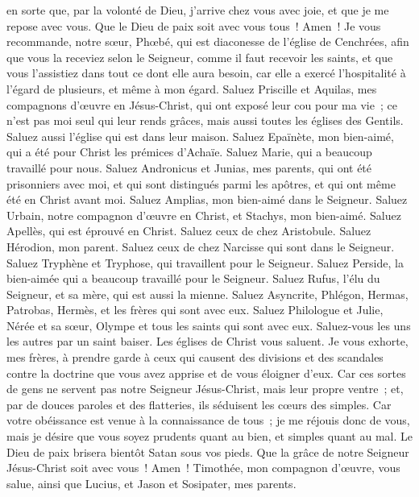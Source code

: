 \begin{multicols}{2}
en sorte que, par la volonté de Dieu, j'arrive chez vous avec joie, et que je me repose avec vous.
Que le Dieu de paix soit avec vous tous~! Amen~!
\VerseOne{}Je vous recommande, notre sœur, Phœbé, qui est diaconesse de l'église de Cenchrées,
afin que vous la receviez selon le Seigneur, comme il faut recevoir les saints, et que vous l'assistiez dans tout ce dont elle aura besoin, car elle a exercé l'hospitalité à l'égard de plusieurs, et même à mon égard.
Saluez Priscille et Aquilas, mes compagnons d'œuvre en Jésus-Christ,
qui ont exposé leur cou pour ma vie~; ce n'est pas moi seul qui leur rends grâces, mais aussi toutes les églises des Gentils.
Saluez aussi l'église qui est dans leur maison. Saluez Epaïnète, mon bien-aimé, qui a été pour Christ les prémices d'Achaïe.
Saluez Marie, qui a beaucoup travaillé pour nous.
Saluez Andronicus et Junias, mes parents, qui ont été prisonniers avec moi, et qui sont distingués parmi les apôtres, et qui ont même été en Christ avant moi.
Saluez Amplias, mon bien-aimé dans le Seigneur.
Saluez Urbain, notre compagnon d'œuvre en Christ, et Stachys, mon bien-aimé.
Saluez Apellès, qui est éprouvé en Christ. Saluez ceux de chez Aristobule.
Saluez Hérodion, mon parent. Saluez ceux de chez Narcisse qui sont dans le Seigneur.
Saluez Tryphène et Tryphose, qui travaillent pour le Seigneur. Saluez Perside, la bien-aimée qui a beaucoup travaillé pour le Seigneur.
Saluez Rufus, l'élu du Seigneur, et sa mère, qui est aussi la mienne.
Saluez Asyncrite, Phlégon, Hermas, Patrobas, Hermès, et les frères qui sont avec eux.
Saluez Philologue et Julie, Nérée et sa sœur, Olympe et tous les saints qui sont avec eux.
Saluez-vous les uns les autres par un saint baiser. Les églises de Christ vous saluent.
Je vous exhorte, mes frères, à prendre garde à ceux qui causent des divisions et des scandales contre la doctrine que vous avez apprise et de vous éloigner d'eux.
Car ces sortes de gens ne servent pas notre Seigneur Jésus-Christ, mais leur propre ventre~; et, par de douces paroles et des flatteries, ils séduisent les cœurs des simples.
Car votre obéissance est venue à la connaissance de tous~; je me réjouis donc de vous, mais je désire que vous soyez prudents quant au bien, et simples quant au mal.
Le Dieu de paix brisera bientôt Satan sous vos pieds. Que la grâce de notre Seigneur Jésus-Christ soit avec vous~! Amen~!
Timothée, mon compagnon d'œuvre, vous salue, ainsi que Lucius, et Jason et Sosipater, mes parents.

\end{multicols}
